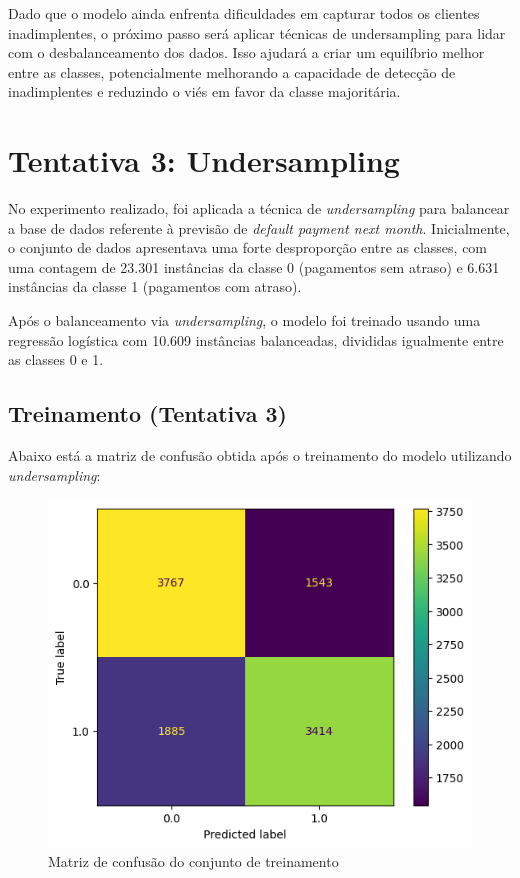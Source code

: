 \documentclass{abntpuc}
\begin{document}
Dado que o modelo ainda enfrenta dificuldades em capturar todos os clientes inadimplentes, o próximo passo será aplicar técnicas de undersampling para lidar com o desbalanceamento dos dados. Isso ajudará a criar um equilíbrio melhor entre as classes, potencialmente melhorando a capacidade de detecção de inadimplentes e reduzindo o viés em favor da classe majoritária.

\newpage

\section{Tentativa 3: Undersampling}

No experimento realizado, foi aplicada a técnica de \textit{undersampling} para balancear a base de dados referente à previsão de \textit{default payment next month}. Inicialmente, o conjunto de dados apresentava uma forte desproporção entre as classes, com uma contagem de 23.301 instâncias da classe 0 (pagamentos sem atraso) e 6.631 instâncias da classe 1 (pagamentos com atraso).

Após o balanceamento via \textit{undersampling}, o modelo foi treinado usando uma regressão logística com 10.609 instâncias balanceadas, divididas igualmente entre as classes 0 e 1.

\subsection*{\centering\large\textbf{Treinamento (Tentativa 3)}}
Abaixo está a matriz de confusão obtida após o treinamento do modelo utilizando \textit{undersampling}:

\begin{figure}[H]
    \centering
    \includegraphics[width=\textwidth]{grafico9.png}
    \caption{Matriz de confusão do conjunto de treinamento}
\end{figure}
\end{document}
